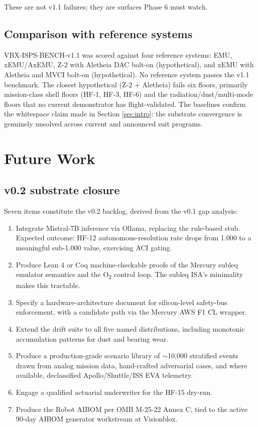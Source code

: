 \documentclass[conference]{IEEEtran}
\theoremstyle{definition}
\theoremstyle{plain}
\theoremstyle{remark}
\begin{document}
These are not v1.1 failures; they are surfaces Phase 6 must watch.

\subsection{Comparison with reference systems}

VBX-ISPS-BENCH-v1.1 was scored against four reference systems: EMU, xEMU/AxEMU, Z-2 with Aletheia DAC bolt-on (hypothetical), and xEMU with Aletheia and MVCI bolt-on (hypothetical). No reference system passes the v1.1 benchmark. The closest hypothetical (Z-2 + Aletheia) fails six floors, primarily mission-class shell floors (HF-1, HF-3, HF-6) and the radiation/dust/multi-mode floors that no current demonstrator has flight-validated. The baselines confirm the whitespace claim made in Section \ref{sec:intro}: the substrate convergence is genuinely unsolved across current and announced suit programs.

\section{Future Work}
\label{sec:future}

\subsection{v0.2 substrate closure}

Seven items constitute the v0.2 backlog, derived from the v0.1 gap analysis:

\begin{enumerate}
\item Integrate Mistral-7B inference via Ollama, replacing the rule-based stub. Expected outcome: HF-12 autonomous-resolution rate drops from 1.000 to a meaningful sub-1.000 value, exercising ACI gating.
\item Produce Lean 4 or Coq machine-checkable proofs of the Mercury subleq emulator semantics and the O\textsubscript{2} control loop. The subleq ISA's minimality makes this tractable.
\item Specify a hardware-architecture document for silicon-level safety-bus enforcement, with a candidate path via the Mercury AWS F1 CL wrapper.
\item Extend the drift suite to all five named distributions, including monotonic accumulation patterns for dust and bearing wear.
\item Produce a production-grade scenario library of $\sim$10{,}000 stratified events drawn from analog mission data, hand-crafted adversarial cases, and where available, declassified Apollo/Shuttle/ISS EVA telemetry.
\item Engage a qualified actuarial underwriter for the HF-15 dry-run.
\item Produce the Robot AIBOM per OMB M-25-22 Annex C, tied to the active 90-day AIBOM generator workstream at Visionblox.
\end{enumerate}
\end{document}
